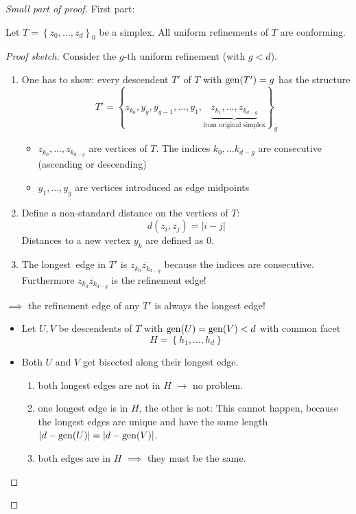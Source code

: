 \begin{proof}[Small part of proof]
	First part:
	\begin{lemma}
		Let $T = \left\{ z_{0},\dots ,z_{d} \right\}_{0}$ be a simplex. All uniform refinements of $T$ are conforming.
	\end{lemma}
  \begin{proof}[Proof sketch]
    Consider the $g$-th uniform refinement (with $g < d$).
		\begin{enumerate}
			\item One has to show: every descendent $T'$ of $T$ with $\operatorname{gen}(T')=g$ has the structure
				\begin{equation*}
					T' = \left\{ z_{k_{0}},y_{g},y_{g-1},\dots ,y_{1},\underbrace{z_{k_{1}},\dots, z_{k_{d-g}} }_{\text{from original simplex}} \right\}_{g}
				\end{equation*}
				\begin{itemize}
					\item $z_{k_{0}}, \dots ,z_{k_{d-g}}$ are vertices of $T$. The indices $k_{0},\dots k_{d-g}$ are consecutive (ascending or descending)
					\item $y_{1},\dots ,y_{g}$ are vertices introduced as edge midpoints
				\end{itemize}
			\item Define a non-standard distance on the vertices of $T$:
				\begin{equation*}
					d(z_{i},z_{j}) = |i-j|
				\end{equation*}
				Distances to a new vertex $y_{k}$ are defined as $0$.
			\item The \glqq longest\grqq\ edge in $T'$ is $\overline{z_{k_{0}}z_{k_{d-g}}}$ because the indices are consecutive.
				Furthermore $\overline{z_{k_{0}}z_{k_{d-g}}}$ is the refinement edge!
		\end{enumerate}
    $\implies$ the refinement edge of any $T'$ is always the \glqq longest\grqq{} edge!
		\begin{itemize}
			\item Let $U,V$ be descendents of $T$ with $\operatorname{gen}(U)=\operatorname{gen}(V)< d$ with common facet 
				\begin{equation*}
					H = \left\{ h_{1},\dots ,h_{d} \right\}	
				\end{equation*}
				 
			\item Both $U$ and $V$ get bisected along their longest edge.
				\begin{enumerate}[label = Case \arabic*]
					\item both longest edges are not in $H$ $\to$ no problem.
					\item one longest edge is in $H$, the other is not:
						This cannot happen, because the longest edges are unique and have the same length $|d- \operatorname{gen}(U)|=|d-\operatorname{gen}(V)|$.
					\item both edges are in $H$ $\implies$ they must be the same. \qedhere
				\end{enumerate}
		\end{itemize} 
  \end{proof}
\end{proof}

